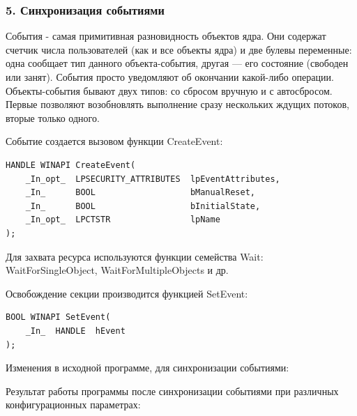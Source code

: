 \documentclass[14pt,a4paper,report]{report}
\begin{document}
\subsubsection{5. Синхронизация событиями}

События - самая примитивная разновидность объектов ядра. Они содержат счетчик числа пользователей (как и все объекты ядра) и две булевы переменные: одна сообщает тип данного объекта-события, другая — его состояние (свободен или занят). События просто уведомляют об окончании какой-либо операции. Объекты-события бывают двух типов: со сбросом вручную и с автосбросом. Первые позволяют возобновлять выполнение сразу нескольких ждущих потоков, вторые  только одного.

Событие создается вызовом функции CreateEvent:

\begin{verbatim}
HANDLE WINAPI CreateEvent(
    _In_opt_  LPSECURITY_ATTRIBUTES  lpEventAttributes,
    _In_      BOOL                   bManualReset,
    _In_      BOOL                   bInitialState,
    _In_opt_  LPCTSTR                lpName
);
\end{verbatim}

Для захвата ресурса используются функции семейства Wait: WaitForSingleObject, WaitForMultipleObjects и др.

Освобождение секции производится функцией SetEvent:

\begin{verbatim}
BOOL WINAPI SetEvent(
    _In_  HANDLE  hEvent
);
\end{verbatim}

Изменения в исходной программе, для синхронизации событиями:



\clearpage

Результат работы программы после синхронизации событиями при различных конфигурационных параметрах:
\end{document}
